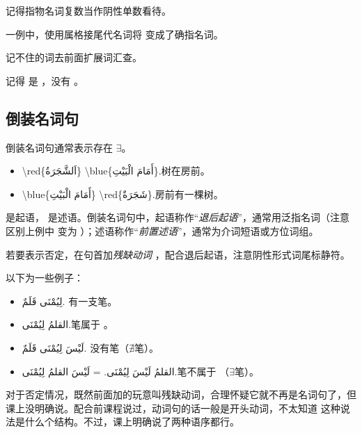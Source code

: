 \begin{attention}
    记得指物名词复数当作阴性单数看待。

     一例中，使用属格接尾代名词将  变成了确指名词。
\end{attention}

\begin{note}
    记不住的词去前面扩展词汇查。

    记得  是  ，没有 。
\end{note}

\subsection{ 倒装名词句}

倒装名词句通常表示存在 $\exists$。

\begin{itemize}
    \item \ac{\red{اَلشَّجَرَةُ} \blue{أَمَامَ الْبَيْتِ}.}{树在房前。}
    \item \ac{\blue{أَمَامَ الْبَيْتِ} \red{شَجَرَةٌ}.}{房前有一棵树。}
\end{itemize}

 是起语， 是述语。倒装名词句中，起语称作``\emph{退后起语}''，通常用泛指名词（注意区别上例中  变为 ）；述语称作``\emph{前置述语}''，通常为介词短语或方位词组。

若要表示否定，在句首加\emph{残缺动词}  ，配合退后起语，注意阴性形式词尾标静符。

以下为一些例子：

\begin{itemize}
    \item \ac{لِيُمْنَى قَلَمٌ.}{ 有一支笔。}
    \item \ac{القلمُ لِيُمْنَى.}{笔属于 。}
    \item \ac{لَيْسَ لِيُمْنَى قَلَمٌ.}{ 没有笔（$\nexists$笔）。}
    \item \ac{القلمُ لَيْسَ لِيُمْنَى. = لَيْسَ القلمُ لِيُمْنَى.}{笔不属于 （$\exists$笔）。}
\end{itemize}

\begin{note}
    对于否定情况，既然前面加的玩意叫残缺动词，合理怀疑它就不再是名词句了，但课上没明确说。配合前课程说过，动词句的话一般是开头动词，不太知道  这种说法是什么个结构。不过，课上明确说了两种语序都行。
\end{note}


